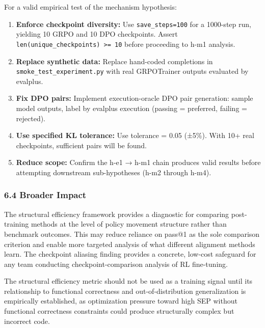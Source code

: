 For a valid empirical test of the mechanism hypothesis:

\begin{enumerate}
\item \textbf{Enforce checkpoint diversity:} Use \texttt{save_steps=100} for a 1000-step run, yielding 10 GRPO and 10 DPO checkpoints. Assert \texttt{len(unique_checkpoints) >= 10} before proceeding to h-m1 analysis.
\item \textbf{Replace synthetic data:} Replace hand-coded completions in \texttt{smoke_test_experiment.py} with real GRPOTrainer outputs evaluated by evalplus.
\item \textbf{Fix DPO pairs:} Implement execution-oracle DPO pair generation: sample model outputs, label by evalplus execution (passing = preferred, failing = rejected).
\item \textbf{Use specified KL tolerance:} Use tolerance = 0.05 (±5\%). With 10+ real checkpoints, sufficient pairs will be found.
\item \textbf{Reduce scope:} Confirm the h-e1 → h-m1 chain produces valid results before attempting downstream sub-hypotheses (h-m2 through h-m4).
\end{enumerate}

\subsubsection{6.4 Broader Impact}

The structural efficiency framework provides a diagnostic for comparing post-training methods at the level of policy movement structure rather than benchmark outcomes. This may reduce reliance on pass@1 as the sole comparison criterion and enable more targeted analysis of what different alignment methods learn. The checkpoint aliasing finding provides a concrete, low-cost safeguard for any team conducting checkpoint-comparison analysis of RL fine-tuning.

The structural efficiency metric should not be used as a training signal until its relationship to functional correctness and out-of-distribution generalization is empirically established, as optimization pressure toward high SEP without functional correctness constraints could produce structurally complex but incorrect code.
